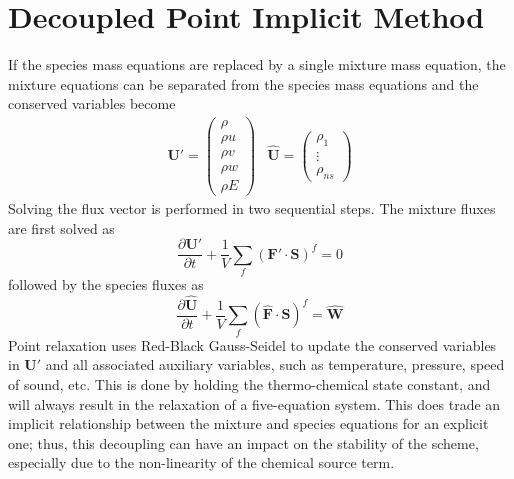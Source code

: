 \section{Decoupled Point Implicit Method}

If the species mass equations are replaced by a single mixture mass equation,
the mixture equations can be separated from the species mass
equations and the conserved variables become
\begin{equation}
	\begin{matrix}
		\mathbf{U}'=\begin{pmatrix}
			\rho \\
			\rho u \\
			\rho v \\
			\rho w \\
			\rho E
		\end{pmatrix} &
		\mathbf{\hat{U}}=\begin{pmatrix}
			\rho_1 \\
			\vdots \\
			\rho_{ns}
		\end{pmatrix}
	\end{matrix}
  \label{dc-variables}
\end{equation}
Solving the flux vector is performed in two sequential steps.  The mixture
fluxes are first solved as
\begin{equation}
  \frac{\partial \mathbf{{U}'}}{\partial t} +
  \frac{1}{V}\sum\limits_{f}(\mathbf{F}'\cdot\mathbf{S})^f = 0
\end{equation}
followed by the species fluxes as
\begin{equation}
  \frac{\partial \mathbf{\hat{U}}}{\partial t} +
  \frac{1}{V}\sum\limits_{f}(\mathbf{\hat{F}}\cdot\mathbf{S})^f =
  \mathbf{\hat{W}}
\end{equation}
Point relaxation uses Red-Black Gauss-Seidel to update the conserved
variables in $\mathbf{U}'$ and all associated auxiliary variables, such as
temperature, pressure, speed of sound, etc.  This is done by holding the
thermo-chemical state constant, and will always result in the relaxation of a
five-equation system.  This does trade an implicit relationship between the mixture
and species equations for an explicit one; thus, this decoupling can have an
impact on the stability of the scheme, especially due to the non-linearity of
the chemical source term\cite{park}.
 
